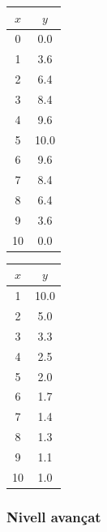 \noindent
\begin{minipage}[t]{0.48\columnwidth}
\centering
\begin{tabular}{c|c}
$x$ & $y$ \\
\hline
0 & 0.0 \\
1 & 3.6 \\
2 & 6.4 \\
3 & 8.4 \\
4 & 9.6 \\
5 & 10.0 \\
6 & 9.6 \\
7 & 8.4 \\
8 & 6.4 \\
9 & 3.6 \\
10 & 0.0 \\
\end{tabular}
\end{minipage}
\hfill
\begin{minipage}[t]{0.48\columnwidth}
\centering
\begin{tabular}{c|c}
$x$ & $y$ \\
\hline
1 & 10.0 \\
2 & 5.0 \\
3 & 3.3 \\
4 & 2.5 \\
5 & 2.0 \\
6 & 1.7 \\
7 & 1.4 \\
8 & 1.3 \\
9 & 1.1 \\
10 & 1.0 \\
\end{tabular}
\end{minipage}

\subsubsection{Nivell avançat}

